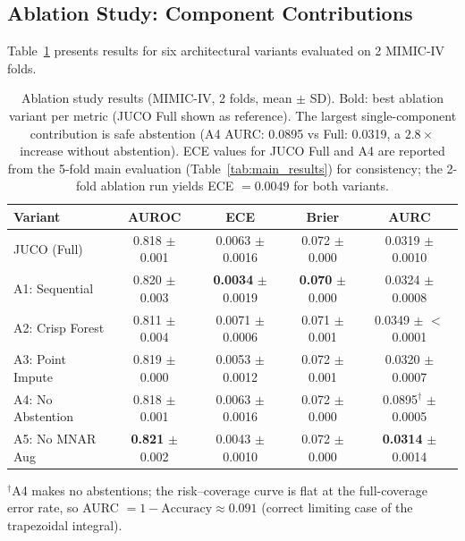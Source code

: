 \documentclass[a4paper,fleqn,longmktitle]{cas-sc}
\begin{document}
	\subsection{Ablation Study: Component Contributions}
	\label{sec:ablation_results}
	
	Table~\ref{tab:ablation} presents results for six architectural
	variants evaluated on 2 MIMIC-IV folds.
	\vspace{5pt}
	\begin{table}[h]
		\centering
		\caption{Ablation study results (MIMIC-IV, 2 folds, mean $\pm$ SD).
			Bold: best ablation variant per metric (JUCO Full shown as reference).
			The largest single-component contribution is safe abstention
			(A4 AURC: 0.0895 vs Full: 0.0319, a $2.8{\times}$ increase without
			abstention). ECE values for JUCO Full and A4 are reported from the
			5-fold main evaluation (Table~\ref{tab:main_results}) for consistency;
			the 2-fold ablation run yields ECE $= 0.0049$ for both variants.}
		\vspace{5pt}
		\label{tab:ablation}
		\small
		\begin{tabular}{lcccc}
			\toprule
			\textbf{Variant} & \textbf{AUROC} & \textbf{ECE} & \textbf{Brier} & \textbf{AURC} \\
			\midrule
			JUCO (Full)       & 0.818 $\pm$ 0.001          & 0.0063 $\pm$ 0.0016          & 0.072 $\pm$ 0.000          & 0.0319 $\pm$ 0.0010 \\
			A1: Sequential    & 0.820 $\pm$ 0.003          & \textbf{0.0034} $\pm$ 0.0019 & \textbf{0.070} $\pm$ 0.000 & 0.0324 $\pm$ 0.0008 \\
			A2: Crisp Forest  & 0.811 $\pm$ 0.004          & 0.0071 $\pm$ 0.0006          & 0.071 $\pm$ 0.001          & 0.0349 $\pm$ ${<}$0.0001 \\
			A3: Point Impute  & 0.819 $\pm$ 0.000          & 0.0053 $\pm$ 0.0012          & 0.072 $\pm$ 0.001          & 0.0320 $\pm$ 0.0007 \\
			A4: No Abstention & 0.818 $\pm$ 0.001          & 0.0063 $\pm$ 0.0016          & 0.072 $\pm$ 0.000          & 0.0895$^{\dagger}$ $\pm$ 0.0005 \\
			A5: No MNAR Aug   & \textbf{0.821} $\pm$ 0.002 & 0.0043 $\pm$ 0.0010          & 0.072 $\pm$ 0.000          & \textbf{0.0314} $\pm$ 0.0014 \\
			\bottomrule
		\end{tabular}
		\par\smallskip
		\raggedright\footnotesize
		$^{\dagger}$A4 makes no abstentions; the risk--coverage curve is
		flat at the full-coverage error rate, so AURC $= 1 -
		\text{Accuracy} \approx 0.091$ (correct limiting case of the
		trapezoidal integral).
	\end{table}
\end{document}
